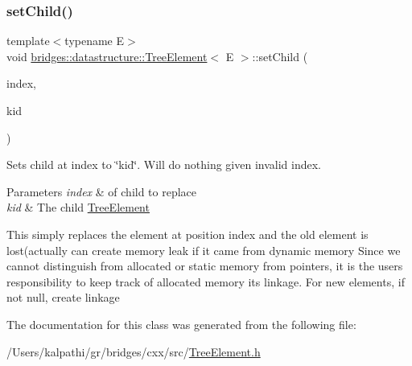\subsubsection{\texorpdfstring{setChild()}{setChild()}}
{\footnotesize\ttfamily template$<$typename E$>$ \\
void \mbox{\hyperlink{classbridges_1_1datastructure_1_1_tree_element}{bridges\+::datastructure\+::\+Tree\+Element}}$<$ E $>$\+::set\+Child (\begin{DoxyParamCaption}\item[{const size\+\_\+t \&}]{index,  }\item[{\mbox{\hyperlink{classbridges_1_1datastructure_1_1_tree_element}{Tree\+Element}}$<$ E $>$ $\ast$}]{kid }\end{DoxyParamCaption})\hspace{0.3cm}{\ttfamily [inline]}}

Sets child at index to \char`\"{}kid\char`\"{}. Will do nothing given invalid index.


\begin{DoxyParams}{Parameters}
{\em index} & of child to replace \\
\hline
{\em kid} & The child \mbox{\hyperlink{classbridges_1_1datastructure_1_1_tree_element}{Tree\+Element}} \\
\hline
\end{DoxyParams}
This simply replaces the element at position index and the old element is lost(actually can create memory leak if it came from dynamic memory Since we cannot distinguish from allocated or static memory from pointers, it is the user\textquotesingle{}s responsibility to keep track of allocated memory its linkage. For new elements, if not null, create linkage

The documentation for this class was generated from the following file\+:\begin{DoxyCompactItemize}
\item 
/\+Users/kalpathi/gr/bridges/cxx/src/\mbox{\hyperlink{_tree_element_8h}{Tree\+Element.\+h}}\end{DoxyCompactItemize}
